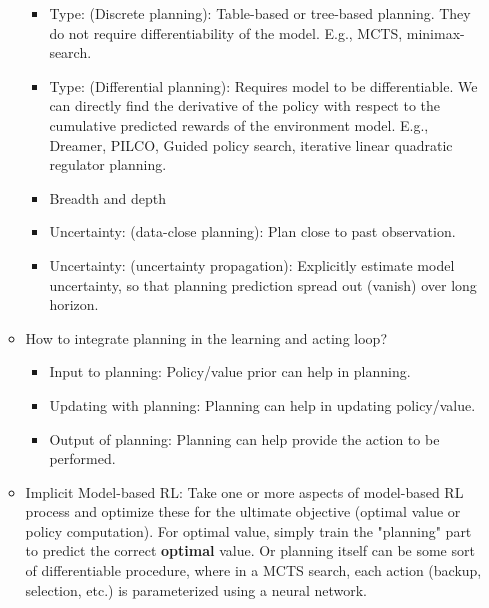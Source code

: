 \documentclass{article}
\theoremstyle{plain}
\begin{document}
\begin{itemize}
\begin{itemize}[nolistsep]
                \begin{itemize}[nolistsep]
                    \item Type: (Discrete planning): Table-based or tree-based planning. They do not require differentiability of the model. E.g., MCTS, minimax-search.
                    \item Type: (Differential planning): Requires model to be differentiable. We can directly find the derivative of the policy with respect to the cumulative predicted rewards of the environment model. E.g., Dreamer, PILCO, Guided policy search, iterative linear quadratic regulator planning.
                    \item Breadth and depth
                    \item Uncertainty: (data-close planning): Plan close to past observation.
                    \item Uncertainty: (uncertainty propagation): Explicitly estimate model uncertainty, so that planning prediction spread out (vanish) over long horizon.
                \end{itemize}
            \item How to integrate planning in the learning and acting loop?
                \begin{itemize}
                    \item Input to planning: Policy/value prior can help in planning.
                    \item Updating with planning: Planning can help in updating policy/value.
                    \item Output of planning: Planning can help provide the action to be performed.
                \end{itemize}
            \item Implicit Model-based RL: Take one or more aspects of model-based RL process and optimize these for the ultimate objective (optimal value or policy computation). For optimal value, simply train the "planning" part to predict the correct \textbf{optimal} value. Or planning itself can be some sort of differentiable procedure, where in a MCTS search, each action (backup, selection, etc.) is parameterized using a neural network.
        \end{itemize}

\end{itemize}
\end{document}
